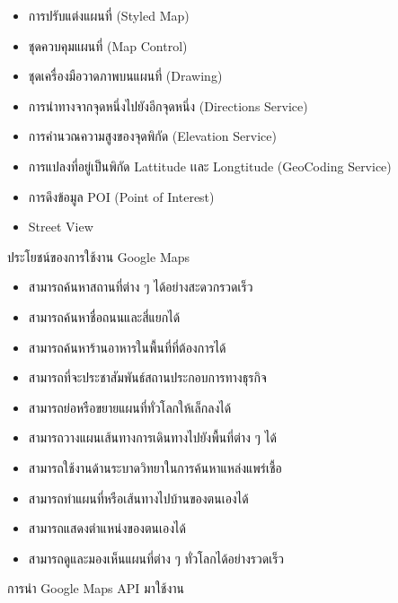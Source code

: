 	\begin{itemize}
		\item การปรับแต่งแผนที่ (Styled Map)
		\item ชุดควบคุมแผนที่ (Map Control)
		\item ชุดเครื่องมือวาดภาพบนแผนที่ (Drawing)
		\item การนำทางจากจุดหนึ่งไปยังอีกจุดหนึ่ง (Directions Service)
		\item การคำนวณความสูงของจุดพิกัด (Elevation Service)
		\item การแปลงที่อยู่เป็นพิกัด Lattitude เเละ Longtitude (GeoCoding Service)
		\item การดึงข้อมูล POI (Point of Interest)
		\item Street View
	\end{itemize}

	ประโยชน์ของการใช้งาน Google Maps

	\begin{itemize}
		\item สามารถค้นหาสถานที่ต่าง ๆ ได้อย่างสะดวกรวดเร็ว
		\item สามารถค้นหาชื่อถนนและสี่แยกได้
		\item สามารถค้นหาร้านอาหารในพื้นที่ที่ต้องการได้
		\item สามารถที่จะประชาสัมพันธ์สถานประกอบการทางธุรกิจ
		\item สามารถย่อหรือขยายแผนที่ทั่วโลกให้เล็กลงได้
		\item สามารถวางแผนเส้นทางการเดินทางไปยังพื้นที่ต่าง ๆ ได้
		\item สามารถใช้งานด้านระบาดวิทยาในการค้นหาแหล่งแพร่เชื้อ
		\item สามารถทำแผนที่หรือเส้นทางไปบ้านของตนเองได้
		\item สามารถแสดงตำแหน่งของตนเองได้
		\item สามารถดูและมองเห็นแผนที่ต่าง ๆ ทั่วโลกได้อย่างรวดเร็ว
	\end{itemize}

	การนำ Google Maps API มาใช้งาน

